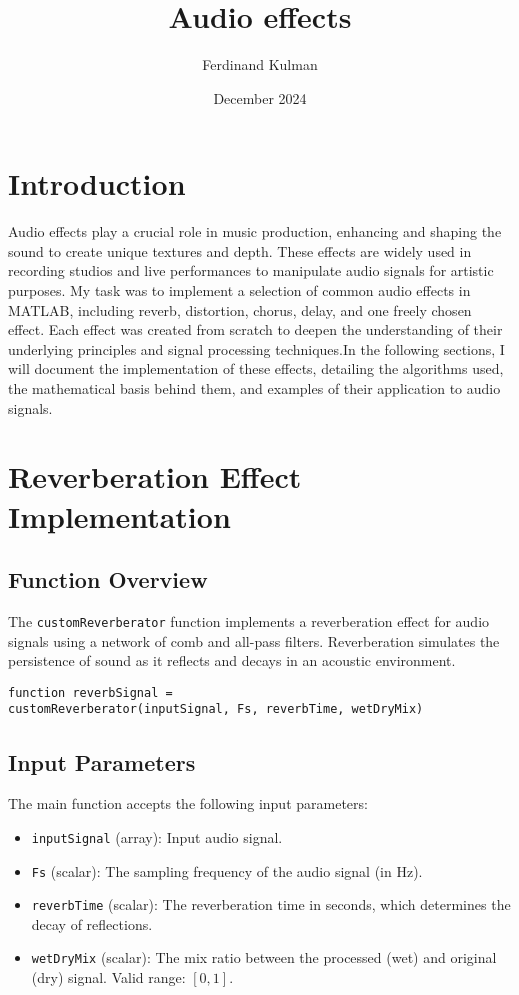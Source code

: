 \documentclass{article}
\title{Audio effects}
\author{Ferdinand Kulman}
\date{December 2024}
\begin{document}
\maketitle

\section{Introduction}

Audio effects play a crucial role in music production, enhancing and shaping the sound to create unique textures and depth. These effects are widely used in recording studios and live performances to manipulate audio signals for artistic purposes. My task was to implement a selection of common audio effects in MATLAB, including reverb, distortion, chorus, delay, and one freely chosen effect. Each effect was created from scratch to deepen the understanding of their underlying principles and signal processing techniques.In the following sections, I will document the implementation of these effects, detailing the algorithms used, the mathematical basis behind them, and examples of their application to audio signals.

\section{Reverberation Effect Implementation}

\subsection{Function Overview}
The \texttt{customReverberator} function implements a reverberation effect for audio signals using a network of comb and all-pass filters. Reverberation simulates the persistence of sound as it reflects and decays in an acoustic environment.

\begin{verbatim}
function reverbSignal =
customReverberator(inputSignal, Fs, reverbTime, wetDryMix)
\end{verbatim}

\subsection{Input Parameters}
The main function accepts the following input parameters:
\begin{itemize}
    \item \texttt{inputSignal} (array): Input audio signal.
    \item \texttt{Fs} (scalar): The sampling frequency of the audio signal (in Hz).
    \item \texttt{reverbTime} (scalar): The reverberation time in seconds, which determines the decay of reflections.
    \item \texttt{wetDryMix} (scalar): The mix ratio between the processed (wet) and original (dry) signal. Valid range: $[0, 1]$.
\end{itemize}
\end{document}

